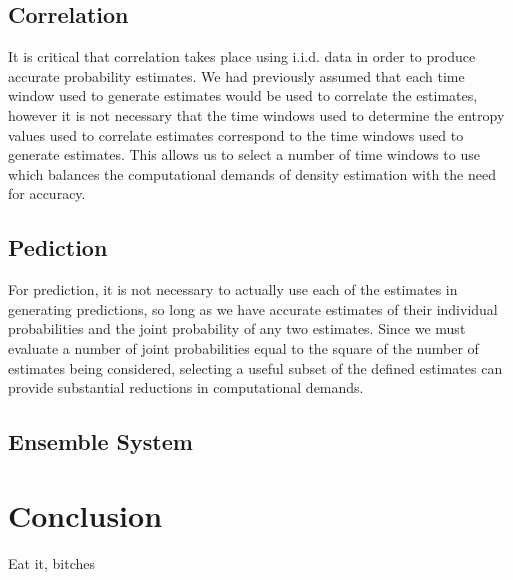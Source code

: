 \documentclass[10pt]{article}
\begin{document}
\subsection{Correlation}
It is critical that correlation takes place using i.i.d. data in order to produce accurate probability estimates.  We had previously assumed that each time window used to generate estimates would be used to correlate the estimates, however it is not necessary that the time windows used to determine the entropy values used to correlate estimates correspond to the time windows used to generate estimates.  This allows us to select a number of time windows to use which balances the computational demands of density estimation with the need for accuracy.

\subsection{Pediction}
For prediction, it is not necessary to actually use each of the estimates in generating predictions, so long as we have accurate estimates of their individual probabilities and the joint probability of any two estimates.  Since we must evaluate a number of joint probabilities equal to the square of the number of estimates being considered, selecting a useful subset of the defined estimates can provide substantial reductions in computational demands.


\subsection{Ensemble System}


\section{Conclusion}
Eat it, bitches
\end{document}
